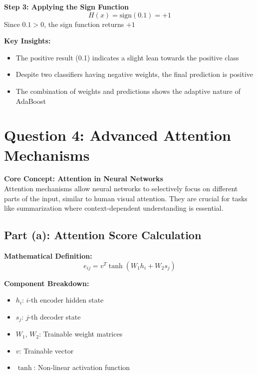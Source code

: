 \documentclass{exam}
\begin{document}
\begin{example}
\textbf{Step 3: Applying the Sign Function}
\begin{equation*}
H(x) = \text{sign}(0.1) = +1
\end{equation*}
Since $0.1 > 0$, the sign function returns $+1$
\end{example}

\begin{important}
\textbf{Key Insights:}
\begin{itemize}[leftmargin=*]
    \item The positive result (0.1) indicates a slight lean towards the positive class
    \item Despite two classifiers having negative weights, the final prediction is positive
    \item The combination of weights and predictions shows the adaptive nature of AdaBoost
\end{itemize}
\end{important}

\section*{\textcolor{conceptblue}{Question 4: Advanced Attention Mechanisms}}

\begin{concept}
\textbf{Core Concept: Attention in Neural Networks}\\
Attention mechanisms allow neural networks to selectively focus on different parts of the input, similar to human visual attention. They are crucial for tasks like summarization where context-dependent understanding is essential.
\end{concept}

\subsection*{Part (a): Attention Score Calculation}

\begin{important}
\textbf{Mathematical Definition:}
\begin{equation}
e_{ij} = v^T \tanh(W_1h_i + W_2s_j)
\end{equation}

\textbf{Component Breakdown:}
\begin{itemize}[leftmargin=*]
    \item $h_i$: $i$-th encoder hidden state
    \item $s_j$: $j$-th decoder state
    \item $W_1$, $W_2$: Trainable weight matrices
    \item $v$: Trainable vector
    \item $\tanh$: Non-linear activation function
\end{itemize}
\end{important}
\end{document}
